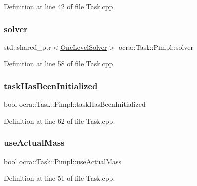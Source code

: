 Definition at line 42 of file Task.\+cpp.

\hypertarget{structocra_1_1Task_1_1Pimpl_af1e09ed90ae5dee85e7fb5bd9d959df7}{}\label{structocra_1_1Task_1_1Pimpl_af1e09ed90ae5dee85e7fb5bd9d959df7} 
\subsubsection{\texorpdfstring{solver}{solver}}
{\footnotesize\ttfamily std\+::shared\+\_\+ptr$<$\hyperlink{classocra_1_1OneLevelSolver}{One\+Level\+Solver}$>$ ocra\+::\+Task\+::\+Pimpl\+::solver}



Definition at line 58 of file Task.\+cpp.

\hypertarget{structocra_1_1Task_1_1Pimpl_a40e20271ee922933345e452f26569ac1}{}\label{structocra_1_1Task_1_1Pimpl_a40e20271ee922933345e452f26569ac1} 
\subsubsection{\texorpdfstring{task\+Has\+Been\+Initialized}{taskHasBeenInitialized}}
{\footnotesize\ttfamily bool ocra\+::\+Task\+::\+Pimpl\+::task\+Has\+Been\+Initialized}



Definition at line 62 of file Task.\+cpp.

\hypertarget{structocra_1_1Task_1_1Pimpl_a33e37d9266902694f72be09c4c5db430}{}\label{structocra_1_1Task_1_1Pimpl_a33e37d9266902694f72be09c4c5db430} 
\subsubsection{\texorpdfstring{use\+Actual\+Mass}{useActualMass}}
{\footnotesize\ttfamily bool ocra\+::\+Task\+::\+Pimpl\+::use\+Actual\+Mass}



Definition at line 51 of file Task.\+cpp.

